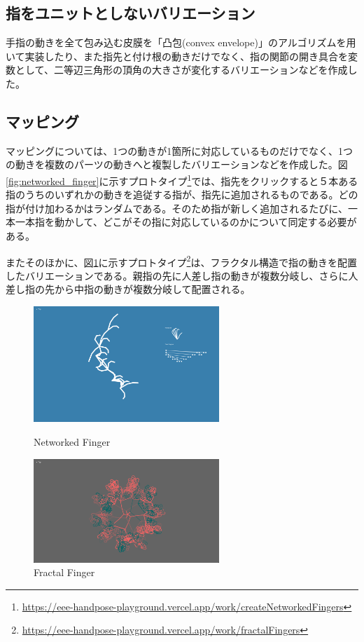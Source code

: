 \subsection*{指をユニットとしないバリエーション}
手指の動きを全て包み込む皮膜を「凸包(convex envelope)」のアルゴリズムを用いて実装したり、また指先と付け根の動きだけでなく、指の関節の開き具合を変数として、二等辺三角形の頂角の大きさが変化するバリエーションなどを作成した。

\subsection{マッピング}
マッピングについては、1つの動きが1箇所に対応しているものだけでなく、1つの動きを複数のパーツの動きへと複製したバリエーションなどを作成した。図\ref{fig:networked_finger}に示すプロトタイプ\footnote{\url{https://eee-handpose-playground.vercel.app/work/createNetworkedFingers}}では、指先をクリックすると５本ある指のうちのいずれかの動きを追従する指が、指先に追加されるものである。どの指が付け加わるかはランダムである。そのため指が新しく追加されるたびに、一本一本指を動かして、どこがその指に対応しているのかについて同定する必要がある。

またそのほかに、図\ref{fig:fractal_finger}に示すプロトタイプ\footnote{\url{https://eee-handpose-playground.vercel.app/work/fractalFingers}}は、フラクタル構造で指の動きを配置したバリエーションである。親指の先に人差し指の動きが複数分岐し、さらに人差し指の先から中指の動きが複数分岐して配置される。

\begin{figure}[htbp]
  \begin{minipage}[b]{0.5\linewidth}
    \centering
    \includegraphics[keepaspectratio, width=7cm]{img/networked_finger.png}
    \caption{Networked Finger}
    \label{fig:networked_finger}
  \end{minipage}
  \begin{minipage}[b]{0.5\linewidth}
    \centering
    \includegraphics[keepaspectratio, width=7cm]{img/fractel_finger.png}
    \caption{Fractal Finger}
    \label{fig:fractal_finger}
  \end{minipage}
\end{figure}

